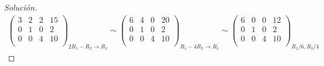 \documentclass[12pt]{article}
\newenvironment{solution}{\begin{proof}[Solución]}{\end{proof}}
\begin{document}
\begin{enumerate}
\begin{solution}
\begin{gather*}
            \left(\begin{array}{ccc|c}  
                3 & 2 & 2 & 15 \\  
                0 & 1 & 0 & 2  \\
                0 & 0 & 4 & 10 \\ 
            \end{array}\right)_{2R_1-R_2 \rightarrow R_1} \sim \left(\begin{array}{ccc|c}  
                6 & 4 & 0 & 20 \\  
                0 & 1 & 0 & 2  \\
                0 & 0 & 4 & 10 \\ 
            \end{array}\right)_{R_1-4R_2 \rightarrow R_1} \sim \left(\begin{array}{ccc|c}  
                6 & 0 & 0 & 12 \\  
                0 & 1 & 0 & 2  \\
                0 & 0 & 4 & 10 \\ 
            \end{array}\right)_{R_1/6, R_3/4}
        \end{gather*}
    \end{solution}
\end{enumerate}



\end{document}
